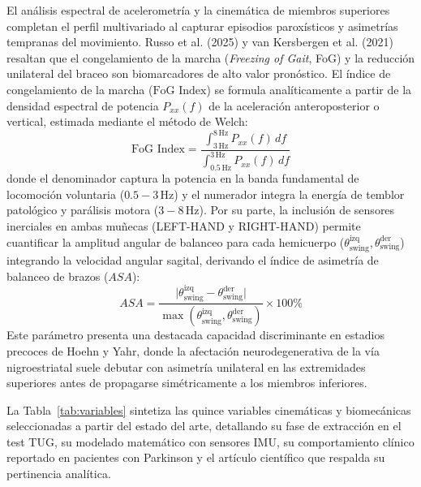 \documentclass[12pt,a4paper]{article}
\begin{document}
El análisis espectral de acelerometría y la cinemática de miembros superiores completan el perfil multivariado al capturar episodios paroxísticos y asimetrías tempranas del movimiento. Russo et al. (2025) y van Kersbergen et al. (2021) resaltan que el congelamiento de la marcha (\emph{Freezing of Gait}, FoG) y la reducción unilateral del braceo son biomarcadores de alto valor pronóstico. El índice de congelamiento de la marcha ($\text{FoG Index}$) se formula analíticamente a partir de la densidad espectral de potencia $P_{xx}(f)$ de la aceleración anteroposterior o vertical, estimada mediante el método de Welch:
\[
\text{FoG Index} = \frac{\int_{3\,\text{Hz}}^{8\,\text{Hz}} P_{xx}(f) \, df}{\int_{0.5\,\text{Hz}}^{3\,\text{Hz}} P_{xx}(f) \, df}
\]
donde el denominador captura la potencia en la banda fundamental de locomoción voluntaria ($0.5 - 3\,\text{Hz}$) y el numerador integra la energía de temblor patológico y parálisis motora ($3 - 8\,\text{Hz}$). Por su parte, la inclusión de sensores inerciales en ambas muñecas (LEFT-HAND y RIGHT-HAND) permite cuantificar la amplitud angular de balanceo para cada hemicuerpo ($\theta_{\text{swing}}^{\text{izq}}, \theta_{\text{swing}}^{\text{der}}$) integrando la velocidad angular sagital, derivando el índice de asimetría de balanceo de brazos ($ASA$):
\[
ASA = \frac{\lvert \theta_{\text{swing}}^{\text{izq}} - \theta_{\text{swing}}^{\text{der}} \rvert}{\max(\theta_{\text{swing}}^{\text{izq}}, \theta_{\text{swing}}^{\text{der}})} \times 100\%
\]
Este parámetro presenta una destacada capacidad discriminante en estadios precoces de Hoehn y Yahr, donde la afectación neurodegenerativa de la vía nigroestriatal suele debutar con asimetría unilateral en las extremidades superiores antes de propagarse simétricamente a los miembros inferiores.

La Tabla~\ref{tab:variables} sintetiza las quince variables cinemáticas y biomecánicas seleccionadas a partir del estado del arte, detallando su fase de extracción en el test TUG, su modelado matemático con sensores IMU, su comportamiento clínico reportado en pacientes con Parkinson y el artículo científico que respalda su pertinencia analítica.
\end{document}
